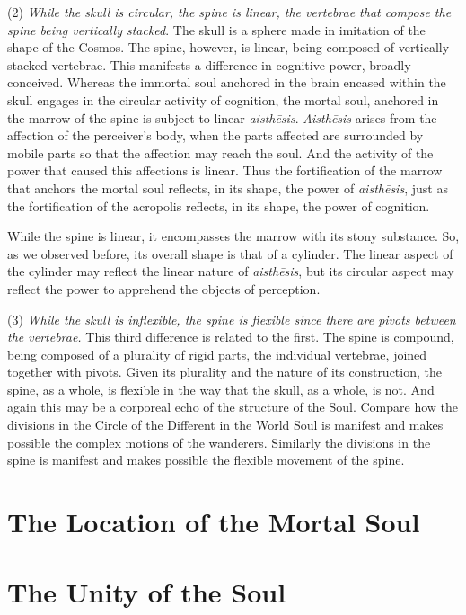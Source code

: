 (2) \emph{While the skull is circular, the spine is linear, the vertebrae that compose the spine being vertically stacked}. The skull is a sphere made in imitation of the shape of the Cosmos. The spine, however, is linear, being composed of vertically stacked vertebrae. This manifests a difference in cognitive power, broadly conceived. Whereas the immortal soul anchored in the brain encased within the skull engages in the circular activity of cognition, the mortal soul, anchored in the marrow of the spine is subject to linear \emph{aisthēsis}. \emph{Aisthēsis} arises from the affection of the perceiver's body, when the parts affected are surrounded by mobile parts so that the affection may reach the soul. And the activity of the power that caused this affections is linear. Thus the fortification of the marrow that anchors the mortal soul reflects, in its shape, the power of \emph{aisthēsis}, just as the fortification of the acropolis reflects, in its shape, the power of cognition.

While the spine is linear, it encompasses the marrow with its stony substance. So, as we observed before, its overall shape is that of a cylinder. The linear aspect of the cylinder may reflect the linear nature of \emph{aisthēsis}, but its circular aspect may reflect the power to apprehend the objects of perception.

(3) \emph{While the skull is inflexible, the spine is flexible since there are pivots between the vertebrae.} This third difference is related to the first. The spine is compound, being composed of a plurality of rigid parts, the individual vertebrae, joined together with pivots. Given its plurality and the nature of its construction, the spine, as a whole, is flexible in the way that the skull, as a whole, is not. And again this may be a corporeal echo of the structure of the Soul. Compare how the divisions in the Circle of the Different in the World Soul is manifest and makes possible the complex motions of the wanderers. Similarly the divisions in the spine is manifest and makes possible the flexible movement of the spine. 



\section{The Location of the Mortal Soul} %
\label{sec:the_location_of_the_mortal_soul}




\section{The Unity of the Soul} %
\label{sec:the_unity_of_the_soul}


